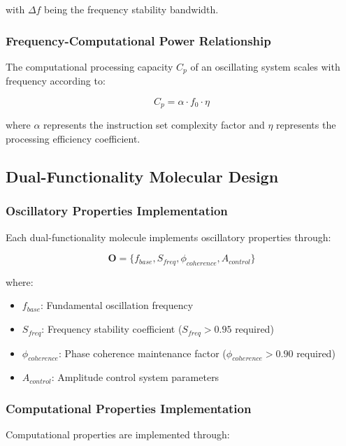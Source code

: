 with $\Delta f$ being the frequency stability bandwidth.

\subsubsection{Frequency-Computational Power Relationship}

The computational processing capacity $C_p$ of an oscillating system scales with frequency according to:

\begin{equation}
C_p = \alpha \cdot f_0 \cdot \eta
\end{equation}

where $\alpha$ represents the instruction set complexity factor and $\eta$ represents the processing efficiency coefficient.

\subsection{Dual-Functionality Molecular Design}

\subsubsection{Oscillatory Properties Implementation}

Each dual-functionality molecule implements oscillatory properties through:

\begin{equation}
\boldsymbol{O} = \{f_{base}, S_{freq}, \phi_{coherence}, A_{control}\}
\end{equation}

where:
\begin{itemize}
\item $f_{base}$: Fundamental oscillation frequency
\item $S_{freq}$: Frequency stability coefficient ($S_{freq} > 0.95$ required)
\item $\phi_{coherence}$: Phase coherence maintenance factor ($\phi_{coherence} > 0.90$ required)  
\item $A_{control}$: Amplitude control system parameters
\end{itemize}

\subsubsection{Computational Properties Implementation}

Computational properties are implemented through:

